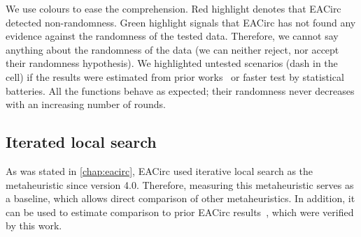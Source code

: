 \documentclass[
    digital,    %
    oneside,    %
    color,
    11pt,
    nocover,
    notable,
    nolof,
    nolot,
]{fithesis3}
\begin{document}
We use colours to ease the comprehension. Red highlight denotes that EACirc detected non-randomness. Green highlight signals that EACirc has not found any evidence against the randomness of the tested data. Therefore, we cannot say anything about the randomness of the data (we can neither reject, nor accept their randomness hypothesis). We highlighted untested scenarios (dash in the cell) if the results were estimated from prior works~\cite{svenda2013towards,sys2014constructing,kubicek2016new,ukropBcThesis} or faster test by statistical batteries. All the functions behave as expected; their randomness never decreases with an increasing number of rounds.

\subsection{Iterated local search}
\label{subsec:res-ss-ils}

As was stated in \cref{chap:eacirc}, EACirc used iterative local search as the metaheuristic since version 4.0. Therefore, measuring this metaheuristic serves as a baseline, which allows direct comparison of other metaheuristics. In addition, it can be used to estimate comparison to prior EACirc results~\cite{svenda2013towards,sys2014constructing,kubicek2016new,ukropBcThesis}, which were verified by this work.
\end{document}
